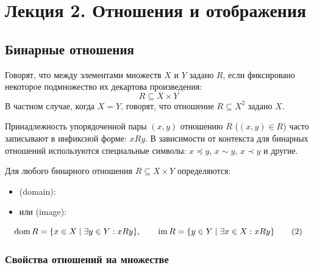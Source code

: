 \section{Лекция 2. Отношения и отображения}

\subsection{Бинарные отношения}

\begin{definition}
    Говорят, что между элементами множеств $X$ и $Y$ задано 
     $R$, если фиксировано некоторое 
    подмножество их декартова произведения:
    \begin{equation} \label{eq:bin_rel_def}
        R \subseteq X \times Y \tag{1}
    \end{equation}
    В частном случае, когда $X = Y$, говорят, что отношение $R \subseteq X^2$ 
    задано  $X$.
\end{definition}

\begin{designation}
    Принадлежность упорядоченной пары $(x, y)$ отношению $R$ 
    ($(x, y) \in R$) часто записывают в инфиксной форме: $x R y$. В 
    зависимости от контекста для бинарных отношений используются специальные 
    символы: $x \preceq y$, $x \sim y$, $x \prec y$ и другие.
\end{designation}

\begin{definition}
    Для любого бинарного отношения $R \subseteq X \times Y$ определяются:
    \begin{itemize}
        \item {} (domain):
        \item {} или  (image):
    \end{itemize}
    \begin{equation} \label{eq:dom_im_def}
        \operatorname{dom} R = \{x \in X \mid \exists y \in Y : x R y\}, \qquad
        \operatorname{im} R = \{y \in Y \mid \exists x \in X : x R y\} \tag{2}
    \end{equation}
\end{definition}

\subsubsection{Свойства отношений на множестве}

